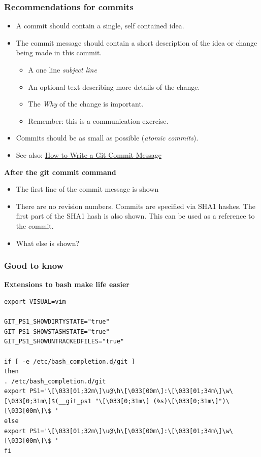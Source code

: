 \documentclass{gittalk}
\begin{document}
\begin{frame}
\frametitle{Recommendations for commits}
\begin{itemize}
  \item A commit should contain a single, self contained idea.
  \item The commit message should contain a short description of the
    idea or change being made in this commit.
    \begin{itemize}
	  \item A one line \emph{subject line}
	  \item An optional text describing more details of the change.
	  \item The \emph{Why} of the change is important.
	  \item Remember: this is a communication exercise.
    \end{itemize}
  \item Commits should be as small as possible (\emph{atomic
    commits}).
  \item See also: \href{http://chris.beams.io/posts/git-commit/}
      {How to Write a Git Commit Message}
\end{itemize}
\pause
\vspace*{0.5em}
\textbf{After the git commit command}
\begin{itemize}
  \item The first line of the commit message is shown
  \item There are no revision numbers. Commits are
        specified via SHA1 hashes. The first part of the SHA1 hash is also
        shown. This can be used as a reference to the commit.
  \item What else is shown?
\end{itemize}
\end{frame}

\begin{frame}[fragile]
\frametitle{Good to know}
\textbf{Extensions to bash make life easier}
\vspace*{0.5em}
\begin{lstlisting}[basicstyle=\tiny\ttfamily]
export VISUAL=vim

GIT_PS1_SHOWDIRTYSTATE="true"
GIT_PS1_SHOWSTASHSTATE="true"
GIT_PS1_SHOWUNTRACKEDFILES="true"

if [ -e /etc/bash_completion.d/git ]
then
. /etc/bash_completion.d/git
export PS1='\[\033[01;32m\]\u@\h\[\033[00m\]:\[\033[01;34m\]\w\[\033[0;31m\]$(__git_ps1 "\[\033[0;31m\] (%s)\[\033[0;31m\]")\[\033[00m\]\$ '
else
export PS1='\[\033[01;32m\]\u@\h\[\033[00m\]:\[\033[01;34m\]\w\[\033[00m\]\$ '
fi
\end{lstlisting}
\end{frame}
\end{document}
